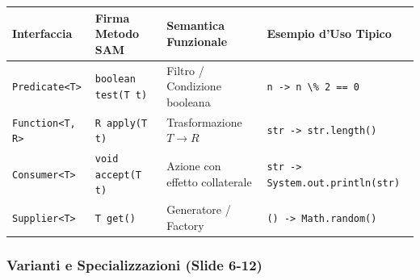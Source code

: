 \documentclass[11pt,a4paper,oneside]{report}
\newcommand{\passthrough}[1]{#1}
\begin{document}
\begin{longtable}[]{@{}
  >{\raggedright\arraybackslash}p{}
  >{\raggedright\arraybackslash}p{}
  >{\raggedright\arraybackslash}p{}
  >{\raggedright\arraybackslash}p{}@{}}
\toprule\noalign{}
\begin{minipage}[b]{\linewidth}\raggedright
Interfaccia
\end{minipage} & \begin{minipage}[b]{\linewidth}\raggedright
Firma Metodo SAM
\end{minipage} & \begin{minipage}[b]{\linewidth}\raggedright
Semantica Funzionale
\end{minipage} & \begin{minipage}[b]{\linewidth}\raggedright
Esempio d'Uso Tipico
\end{minipage} \\
\midrule\noalign{}
\endhead
\bottomrule\noalign{}
\endlastfoot
\passthrough{\lstinline!Predicate<T>!} &
\passthrough{\lstinline!boolean test(T t)!} & Filtro / Condizione
booleana & \passthrough{\lstinline!n -> n \% 2 == 0!} \\
\passthrough{\lstinline!Function<T, R>!} &
\passthrough{\lstinline!R apply(T t)!} & Trasformazione \(T \to R\) &
\passthrough{\lstinline!str -> str.length()!} \\
\passthrough{\lstinline!Consumer<T>!} &
\passthrough{\lstinline!void accept(T t)!} & Azione con effetto
collaterale &
\passthrough{\lstinline!str -> System.out.println(str)!} \\
\passthrough{\lstinline!Supplier<T>!} &
\passthrough{\lstinline!T get()!} & Generatore / Factory &
\passthrough{\lstinline!() -> Math.random()!} \\
\end{longtable}

\subsubsection{Varianti e Specializzazioni (Slide
6-12)}\label{chap17_varianti-e-specializzazioni-slide-6-12}
\end{document}
